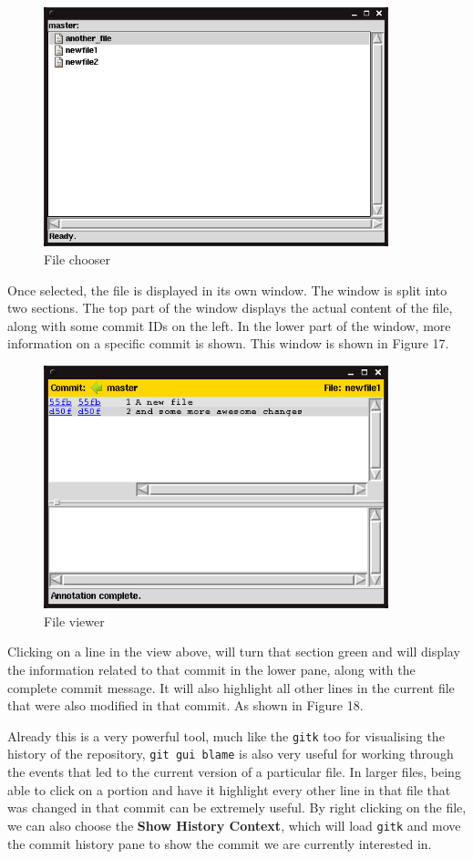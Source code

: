 \begin{figure}[hbt]
\centering
\includegraphics[width=10cm]{images/f-w5-d16.png}
\caption{File chooser}
\end{figure} 

Once selected, the file is displayed in its own window.  The window is split into two sections.  The top part of the window displays the actual content of the file, along with some commit IDs on the left.  In the lower part of the window, more information on a specific commit is shown.  This window is shown in Figure 17.

\begin{figure}[hbt]
\centering
\includegraphics[width=10cm]{images/f-w5-d17.png}
\caption{File viewer}
\end{figure} 

Clicking on a line in the view above, will turn that section green and will display the information related to that commit in the lower pane, along with the complete commit message.  It will also highlight all other lines in the current file that were also modified in that commit.  As shown in Figure 18.

Already this is a very powerful tool, much like the \texttt{gitk} too for visualising the history of the repository, \texttt{git gui blame} is also very useful for working through the events that led to the current version of a particular file.  In larger files, being able to click on a portion and have it highlight every other line in that file that was changed in that commit can be extremely useful.  By right clicking on the file, we can also choose the \textbf{Show History Context}, which will load \texttt{gitk} and move the commit history pane to show the commit we are currently interested in.

